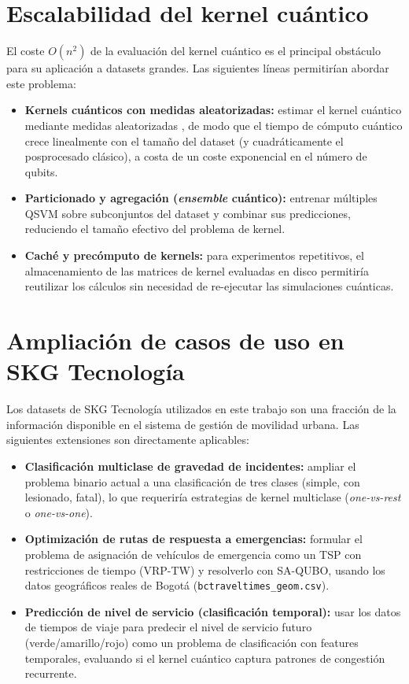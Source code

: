 \section{Escalabilidad del kernel cuántico}

El coste $O(n^2)$ de la evaluación del kernel cuántico es el principal obstáculo para su aplicación a datasets grandes. Las siguientes líneas permitirían abordar este problema:

\begin{itemize}
    \item \textbf{Kernels cuánticos con medidas aleatorizadas:} estimar el kernel cuántico mediante medidas aleatorizadas \citep{haug2023}, de modo que el tiempo de cómputo cuántico crece linealmente con el tamaño del dataset (y cuadráticamente el posprocesado clásico), a costa de un coste exponencial en el número de qubits.
    \item \textbf{Particionado y agregación (\textit{ensemble} cuántico):} entrenar múltiples QSVM sobre subconjuntos del dataset y combinar sus predicciones, reduciendo el tamaño efectivo del problema de kernel.
    \item \textbf{Caché y precómputo de kernels:} para experimentos repetitivos, el almacenamiento de las matrices de kernel evaluadas en disco permitiría reutilizar los cálculos sin necesidad de re-ejecutar las simulaciones cuánticas.
\end{itemize}

\section{Ampliación de casos de uso en SKG Tecnología}

Los datasets de SKG Tecnología utilizados en este trabajo son una fracción de la información disponible en el sistema de gestión de movilidad urbana. Las siguientes extensiones son directamente aplicables:

\begin{itemize}
    \item \textbf{Clasificación multiclase de gravedad de incidentes:} ampliar el problema binario actual a una clasificación de tres clases (simple, con lesionado, fatal), lo que requeriría estrategias de kernel multiclase (\textit{one-vs-rest} o \textit{one-vs-one}).
    \item \textbf{Optimización de rutas de respuesta a emergencias:} formular el problema de asignación de vehículos de emergencia como un TSP con restricciones de tiempo (VRP-TW) y resolverlo con SA-QUBO, usando los datos geográficos reales de Bogotá (\texttt{bctraveltimes\_geom.csv}).
    \item \textbf{Predicción de nivel de servicio (clasificación temporal):} usar los datos de tiempos de viaje para predecir el nivel de servicio futuro (verde/amarillo/rojo) como un problema de clasificación con features temporales, evaluando si el kernel cuántico captura patrones de congestión recurrente.
\end{itemize}

